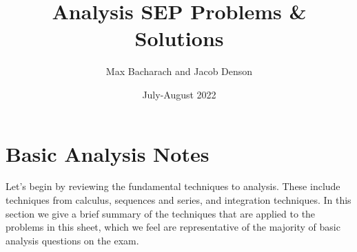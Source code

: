 \documentclass{exam}
\title{Analysis SEP Problems \& Solutions}
\date{July-August 2022}
\author{Max Bacharach and Jacob Denson}
\theoremstyle{problemstyle}
\newcommand{\1}[1]{\textbf{1}_{\left[#1\right]}} %
\begin{document}
\maketitle

\tableofcontents

\newpage

\section{Basic Analysis Notes}

Let's begin by reviewing the fundamental techniques to analysis. These include techniques from calculus, sequences and series, and integration techniques. In this section we give a brief summary of the techniques that are applied to the problems in this sheet, which we feel are representative of the majority of basic analysis questions on the exam.
\end{document}
